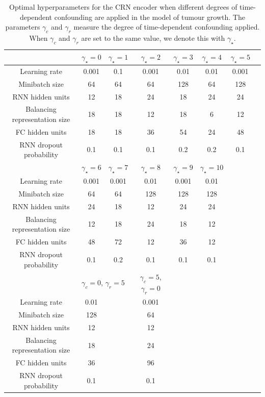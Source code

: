 \documentclass{article} %
\begin{document}
	
	\begin{table}[ht]
		\caption{Optimal hyperparameters for the CRN encoder when different degrees of time-dependent confounding are applied in the model of tumour growth. The parameters $\gamma_c$ and $\gamma_r$ measure the degree of time-dependent confounding applied. When $\gamma_c$ and $\gamma_r$ are set to the same value, we denote this with $\gamma_{\star}$. }
		\label{tab:optimal_hyperparameters_CRN_encoder}
		\vskip 0.15in
		\begin{center}
			\begin{small}
				\begin{tabular}{cccccccc}
					\toprule
					 & $\gamma_{\star}=0$ & $\gamma_{\star}=1$ & $\gamma_{\star}=2$  & $\gamma_{\star}=3$ & $\gamma_{\star}=4$ & $\gamma_{\star}=5$ &  \\
					\hline
					\hline
					Learning rate &    0.001  & 0.1 & 0.001 & 0.01 & 0.01 & 0.001 \\
					Minibatch size &  64 & 64 & 64 & 128 & 64 & 128\\
					RNN hidden units & 12 & 18 & 24 & 18 & 24 & 24  \\
					Balancing representation size  & 18 & 18 & 12 & 18 & 6 & 12  \\
					FC hidden units & 18 & 18 & 36 & 54 & 24 & 48  \\
					RNN dropout probability &  0.1 & 0.1 & 0.1 & 0.2   & 0.2 &  0.1\\
					\midrule 
					\midrule 
					 &$\gamma_{\star}=6$ & $\gamma_{\star}=7$ & $\gamma_{\star}=8$  & $\gamma_{\star}=9$ & $\gamma_{\star}=10$ \\
					\hline
					\hline
					Learning rate  & 0.001 & 0.001 & 0.01 & 0.001 & 0.01 &   \\
					Minibatch size  & 64 & 64 & 128 & 128 & 128 & \\
					RNN hidden units & 24 & 18 &  12& 24& 24 &  \\
					Balancing representation size & 12  & 18 & 24 & 18 & 12 & \\
					FC hidden units & 48 & 72 & 12 & 36 & 12 \\
					RNN dropout probability & 0.1 & 0.2 & 0.1 & 0.1 & 0.1 & \\
					\midrule 
					\midrule 
					& \multicolumn{2}{l}{$\gamma_c = 0$, $\gamma_r=5$} & $\gamma_c = 5$, $\gamma_r=0$ \\
					\hline
					\hline
					Learning rate  & 0.01 & & 0.001  \\
					Minibatch size  & 128 & &64\\
					RNN hidden units & 12 & & 12 \\
					Balancing representation size  & 18 & &24\\
					FC hidden units  & 36 & & 96\\
					RNN dropout probability & 0.1 & &0.1\\
					\bottomrule
				\end{tabular}
			\end{small}
		\end{center}
		\vskip -0.1in
	\end{table}
\end{document}
